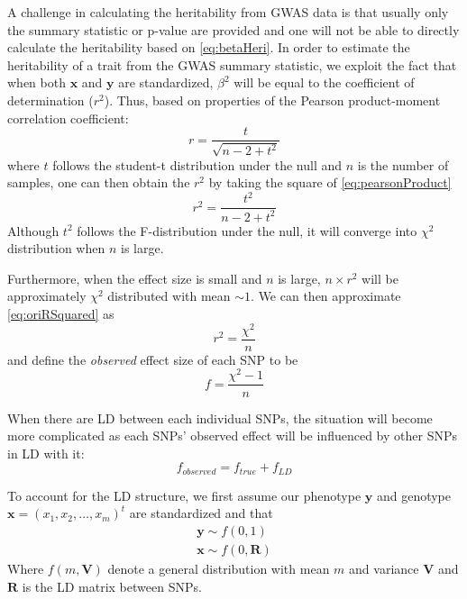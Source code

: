 			A challenge in calculating the heritability from \gls{GWAS} data is that usually only the summary statistic or p-value are provided and one will not be able to directly calculate the heritability based on \cref{eq:betaHeri}. 
			In order to estimate the heritability of a trait from the \gls{GWAS} summary statistic, we exploit the fact that when both $\boldsymbol{x}$ and $\boldsymbol{y}$ are standardized, $\beta^2$ will be equal to the coefficient of determination ($r^2$). 
			Thus, based on properties of the Pearson product-moment correlation coefficient:
			\begin{equation}
				r = \frac{t}{\sqrt{n-2+t^2}}
				\label{eq:pearsonProduct}
			\end{equation}
			where $t$ follows the student-t distribution under the null and $n$ is the number of samples, one can then obtain the $r^2$ by taking the square of \cref{eq:pearsonProduct}
			\begin{equation}
				r^2 = \frac{t^2}{n-2+t^2}
				\label{eq:oriRSquared}
			\end{equation}
			Although $t^2$ follows the F-distribution under the null, it will converge into $\chi^2$ distribution when $n$ is large.
			
			Furthermore, when the effect size is small and $n$ is large, $n\times r^2$ will be approximately $\chi^2$ distributed with mean $\sim 1$. 
			We can then approximate \cref{eq:oriRSquared} as
			\begin{equation}
				r^2= \frac{\chi^2}{n}
				\label{eq:approxChi}
			\end{equation}
			and define the \emph{observed} effect size of each \gls{SNP} to be
			\begin{equation}
			f=\frac{\chi^2-1}{n}
			\label{eq:observedEffect}
			\end{equation}
			
			When there are \gls{LD} between each individual \glspl{SNP}, the situation will become more complicated as each \glspl{SNP}' observed effect will be influenced by other \glspl{SNP} in \gls{LD} with it:
			\begin{equation}
			f_{observed} = f_{true}+f_{LD}
			\label{eq:conceptF}
			\end{equation}
			
			To account for the \gls{LD} structure, we first assume our phenotype $\boldsymbol{y}$ and genotype $\boldsymbol{x}=(x_1,x_2,\dots,x_m)^t$ are standardized and that
			\begin{align*}
				\boldsymbol{y}\sim f(0,1) \\
				\boldsymbol{x}\sim f(0,\boldsymbol{R})
			\end{align*}
			Where $f(m, \boldsymbol{V})$ denote a general distribution with mean $m$ and variance $\boldsymbol{V}$ and $\boldsymbol{R}$ is the \gls{LD} matrix between \glspl{SNP}.
			

